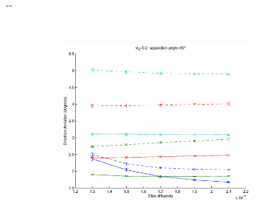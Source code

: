 \documentclass{article}
\begin{document}
\begin{figure}[H]
\begin{adjustwidth}{-\oddsidemargin}{-\rightmargin}
\begin{subfigure}{0.8\paperwidth}
\begin{subfigure}{0.3\textwidth}
      \end{subfigure}
      ~
      \begin{subfigure}{0.3\textwidth}
        \centering
        \includegraphics[width=\textwidth]{figures/synth_bas_weights__snr=20__w1=2__angle=90.eps}
      \end{subfigure}
    \end{subfigure}
    

\end{adjustwidth}
\end{figure}
\end{document}
